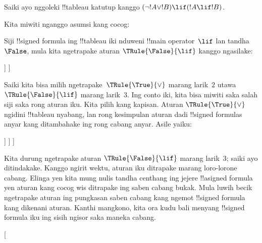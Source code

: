 \documentclass[../../../include/open-logic-section]{subfiles}
\begin{document}
\begin{ex}
Saiki ayo nggoleki !!{tableau} katutup kanggo $(\lnot !A \lor !B) \lif (!A
\lif !B)$.

Kita miwiti nganggo asumsi kang cocog:
\begin{oltableau}
  [\sFmla{\False}{(\lnot \formula{A} \lor \formula{B}) \lif
      (\formula{A} \lif \formula{B})}, just=\TAss]
\end{oltableau}
Siji !!{signed formula} ing !!{tableau} iki nduweni !!{main operator}~$\lif$
lan tandha~$\False$, mula kita ngetrapake aturan $\TRule{\False}{\lif}$
kanggo ngasilake:
\begin{oltableau}
  [\sFmla{\False}{(\lnot \formula{A} \lor \formula{B})
      \lif (\formula{A} \lif \formula{B})}, just=\TAss, checked
    [\sFmla{\True}{\lnot \formula{A} \lor \formula{B}},
      just={\TRule{\False}{\lif}[1]}
      [\sFmla{\False}{(\formula{A} \lif \formula{B})},
        just={\TRule{\False}{\lif}[1]}
      ]
    ]
  ]
\end{oltableau}
Saiki kita bisa milih ngetrapake~$\TRule{\True}{\lor}$ marang
larik~$2$ utawa $\TRule{\False}{\lif}$ marang larik~$3$.
Ing conto iki, kita bisa miwiti saka salah siji saka rong aturan iku. Kita pilih kang kapisan.
Aturan $\TRule{\True}{\lor}$ ngidini !!{tableau} nyabang, lan rong
kesimpulan aturan dadi !!{signed formula}s anyar kang ditambahake ing
rong cabang anyar. Asile yaiku:
\begin{oltableau}
  [\sFmla{\False}{(\lnot \formula{A} \lor \formula{B}) \lif
      (\formula{A} \lif \formula{B})}, just=\TAss, checked
    [\sFmla{\True}{\lnot \formula{A} \lor \formula{B}},
      just={\TRule{\False}{\lif}[1]}, checked
      [\sFmla{\False}{(\formula{A} \lif \formula{B})},
        just={\TRule{\False}{\lif}[1]}
        [\sFmla{\True}{\lnot \formula{A}}, just={\TRule{\True}{\lor}[2]}]
        [\sFmla{\True}{\formula{B}}, just={\TRule{\True}{\lor}[2]}]
      ]
    ]
  ]
\end{oltableau}
Kita durung ngetrapake aturan $\TRule{\False}{\lif}$ marang larik~$3$;
saiki ayo ditindakake. Kanggo ngirit wektu, aturan iku ditrapake
marang loro-lorone cabang. Elinga yen kita mung nulis tandha centhang ing jejere
!!a{signed formula} yen aturan kang cocog wis ditrapake ing saben
cabang bukak. Mula luwih becik ngetrapake aturan ing pungkasan saben
cabang kang ngemot !!{signed formula} kang dikenani aturan. Kanthi
mangkono, kita ora kudu bali menyang !!{signed formula} iku ing sisih
ngisor saka maneka cabang.
\begin{oltableau}
  [
\end{oltableau}
\end{ex}
\end{document}
